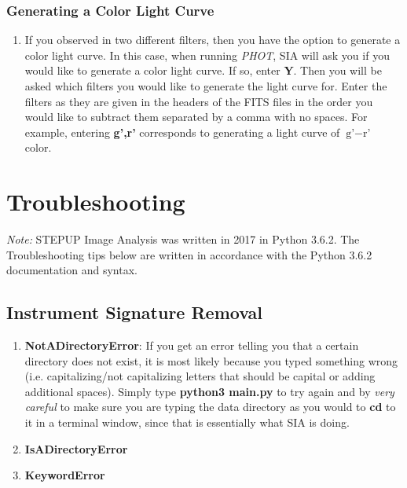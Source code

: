 \documentclass[11pt]{report}
\begin{document}
\subsection{Generating a Color Light Curve}
\begin{enumerate}
\item If you observed in two different filters, then you have the option to generate a color light curve. In this case, when running \emph{PHOT}, SIA will ask you if you would like to generate a color light curve. If so, enter {\bf Y}. Then you will be asked which filters you would like to generate the light curve for. Enter the filters as they are given in the headers of the FITS files in the order you would like to subtract them separated by a comma with no spaces. For example, entering {\bf g',r'} corresponds to generating a light curve of $\textrm{g'}-\textrm{r'}$ color.
\end{enumerate}



\chapter{Troubleshooting}

\emph{Note:} STEPUP Image Analysis was written in 2017 in Python 3.6.2. The Troubleshooting tips below are written in accordance with the Python 3.6.2 documentation and syntax. 

\section{Instrument Signature Removal}
\begin{enumerate}
\item {\bf NotADirectoryError}: If you get an error telling you that a certain directory does not exist, it is most likely because you typed something wrong (i.e. capitalizing/not capitalizing letters that should be capital or adding additional spaces). Simply type {\bf python3 main.py} to try again and by \emph{very careful} to make sure you are typing the data directory as you would to {\bf cd} to it in a terminal window, since that is essentially what SIA is doing.
\item {\bf IsADirectoryError}
\item {\bf KeywordError}
\end{enumerate}
\end{document}
